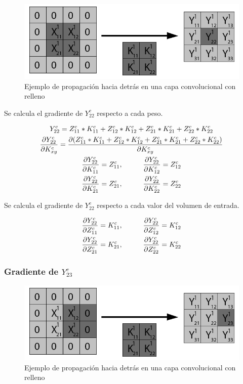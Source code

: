 \begin{figure}[H]
	\centering
	\includegraphics[width=0.8\linewidth]{imagenes/conv_back_padding_5.jpg} 
	\caption{Ejemplo de propagación hacia detrás en una capa convolucional con relleno}
\end{figure}

Se calcula el gradiente de $Y^c_{22}$ respecto a cada peso.

\begin{gather}
	Y^c_{22} = Z^c_{11} * K^c_{11} + Z^c_{12} * K^c_{12} + Z^c_{21} * K^c_{21} + Z^c_{22} * K^c_{22} \\
	\frac{\partial Y^c_{22}}{\partial K^c_{xy}} = \frac{\partial (Z^c_{11} * K^c_{11} + Z^c_{12} * K^c_{12} + Z^c_{21} * K^c_{21} + Z^c_{22} * K^c_{22})}{\partial K^c_{xy}} \\
	\frac{\partial Y^c_{22}}{\partial K^c_{11}} = Z^c_{11}, \hspace{10mm} \frac{\partial Y^c_{22}}{\partial K^c_{12}} = Z^c_{12} \\
	\frac{\partial Y^c_{22}}{\partial K^c_{21}} = Z^c_{21}, \hspace{10mm} \frac{\partial Y^c_{22}}{\partial K^c_{22}} = Z^c_{22}
\end{gather}

Se calcula el gradiente de $Y^c_{22}$ respecto a cada valor del volumen de entrada.

\begin{gather}
	\frac{\partial Y^c_{22}}{\partial Z^c_{11}} = K^c_{11}, \hspace{10mm} \frac{\partial Y^c_{22}}{\partial Z^c_{12}} = K^c_{12}\\
	\frac{\partial Y^c_{22}}{\partial Z^c_{21}} = K^c_{21}, \hspace{10mm} \frac{\partial Y^c_{22}}{\partial Z^c_{22}} = K^c_{22}
\end{gather}

\subsubsection{Gradiente de $Y^c_{23}$}

\begin{figure}[H]
	\centering
	\includegraphics[width=0.8\linewidth]{imagenes/conv_back_padding_6.jpg} 
	\caption{Ejemplo de propagación hacia detrás en una capa convolucional con relleno}
\end{figure}

